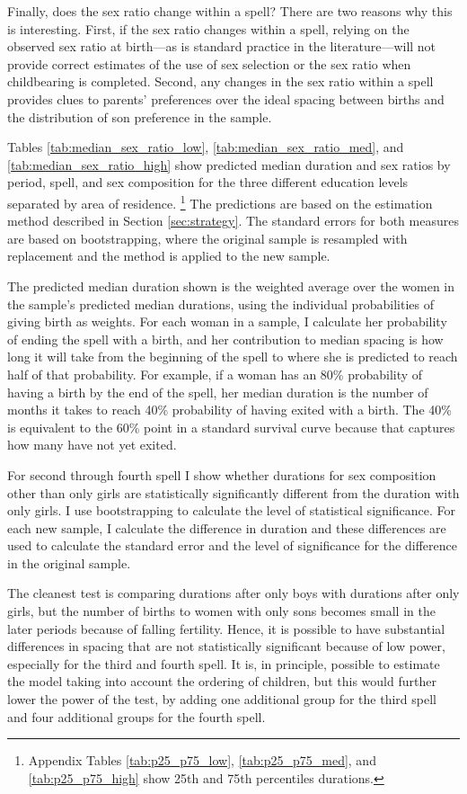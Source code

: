 \documentclass[12pt,letterpaper]{article}
\begin{document}
Finally, does the sex ratio change within a spell?
There are two reasons why this is interesting.
First, if the sex ratio changes within a spell, relying on the observed sex
ratio at birth---as is standard practice in the literature---will not provide
correct estimates of the use of sex selection or the sex ratio when 
childbearing is completed.
Second, any changes in the sex ratio within a spell provides clues
to parents' preferences over the ideal spacing between births and the
distribution of son preference in the sample.


Tables \ref{tab:median_sex_ratio_low}, \ref{tab:median_sex_ratio_med}, and
\ref{tab:median_sex_ratio_high}
show predicted median duration and sex ratios by period, spell, and sex 
composition for the three different education levels separated by area of residence.%
\footnote{
Appendix Tables \ref{tab:p25_p75_low}, \ref{tab:p25_p75_med}, and 
\ref{tab:p25_p75_high} show 25th and 75th percentiles durations.
} 
The predictions are based on the estimation method described in 
Section \ref{sec:strategy}.
The standard errors for both measures are based on bootstrapping, where the 
original sample is resampled with replacement and the method is applied to 
the new sample.

The predicted median duration shown is the weighted average over the women in the 
sample's predicted median durations, using the individual probabilities of 
giving birth as weights.
For each woman in a sample, I calculate her probability of ending the spell 
with a birth, and her contribution to median spacing is how long it will take
from the beginning of the spell to where she is predicted to reach half of that probability.
For example, if a woman has an 80\% probability of having a birth by the end of 
the spell, her median duration is the number of months it takes to reach
40\% probability of having exited with a birth.
The 40\% is equivalent to the 60\% point in a standard survival curve because that 
captures how many have not yet exited.

For second through fourth spell I show whether durations for sex composition
other than only girls are statistically significantly different from the
duration with only girls.
I use bootstrapping to calculate the level of statistical significance.
For each new sample, I calculate the difference in duration and these
differences are used to calculate the standard error and the level of
significance for the difference in the original sample.
 
The cleanest test is comparing durations after only boys with durations after
only girls, but the number of births to women with only sons becomes small 
in the later periods because of falling fertility.
Hence, it is possible to have substantial differences in spacing that are
not statistically significant because of low power, especially for the third 
and fourth spell.
It is, in principle, possible to estimate the model taking into account the 
ordering of children, but this would further lower the power of the test, by 
adding one additional group for the third spell and four additional groups for the fourth spell.
\end{document}
